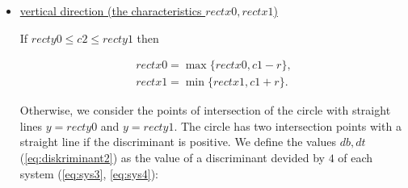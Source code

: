 \documentclass{report}
\begin{document}
\begin{itemize}
	{\bfseries Note:} we define the default intersection points for the algorithm to work correctly as:
	\begin{equation}
		\begin{gathered}
			l1 = r1 =  \infty,\\
			l2 = r2 = -\infty.
			\label{eq:lrinf}
		\end{gathered}
	\end{equation}
	
	We check the sign of $dl, dr$ and find the intersection points:
	
	\begin{equation}
		\begin{cases}
			dl > 0,\\ 
			l1 = c2 - \sqrt {dl},\\
			l2 = c2 + \sqrt {dl}.
			\label{eq:l1l2}
		\end{cases}
	\end{equation}
	
	\begin{equation}
		\begin{cases}
			dr > 0,\\ 
			r1 = c2 - \sqrt {dr},\\
			r2 = c2 + \sqrt {dr}.
			\label{eq:r1r2}
		\end{cases}
	\end{equation}
	
	We define the characteristics of rectangle as:
	
	\begin{equation}
		\begin{gathered}
			recty0 = \max\{recty0, \min\{l1, r1\}\},\\
			recty1 = \min\{recty1, \max\{l2, r2\}\}.
		\end{gathered}
	\end{equation}
	
	\item \underline {vertical direction (the characteristics $rectx0, rectx1$) }
	
	If   $recty0 \le c2 \le recty1$ then
	
	\begin{equation}
		\begin{gathered}
			rectx0 = \max\{rectx0, c1-r\},\\
			rectx1 = \min\{rectx1, c1+r\}.
		\end{gathered}
	\end{equation}
	
	Otherwise, we consider the points of intersection of the circle with straight lines $y = recty0$ and $y = recty1$. The circle has two intersection points with a straight line if the discriminant is positive. We define the values $db, dt$ (\ref{eq:diskriminant2}) as the value of a discriminant devided by  $4$ of each system (\ref{eq:sys3}, \ref{eq:sys4}):
	

\end{itemize}
\end{document}
